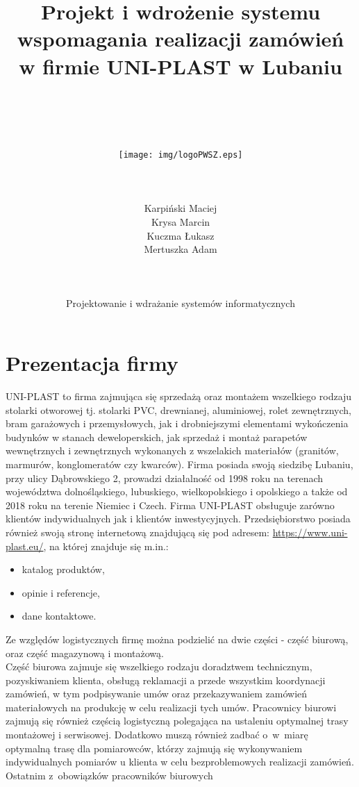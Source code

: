 \documentclass[12pt,a4paper]{article}
\author{\\\\\\\\\texttt{[image: img/logoPWSZ.eps]}\\\\\\\\
	Karpiński Maciej\\
	Krysa Marcin\\
	Kuczma Łukasz\\
	Mertuszka Adam\\\\\\\\
	Projektowanie i wdrażanie systemów informatycznych}
\title{Projekt i wdrożenie systemu wspomagania realizacji zamówień w firmie UNI-PLAST w Lubaniu}
\date{}
\begin{document}
	\maketitle
	\thispagestyle{empty}
	\clearpage

	\tableofcontents
	\newpage

	\section{Prezentacja firmy}
		\indent UNI-PLAST to firma zajmująca się sprzedażą oraz montażem wszelkiego rodzaju stolarki otworowej tj. stolarki PVC, drewnianej, aluminiowej, rolet zewnętrznych,
			bram garażowych i przemysłowych, jak i drobniejszymi elementami wykończenia budynków w stanach deweloperskich, jak sprzedaż i montaż parapetów wewnętrznych i zewnętrznych
			wykonanych z wszelakich materiałów (granitów, marmurów, konglomeratów czy kwarców). Firma posiada swoją siedzibę Lubaniu, przy ulicy Dąbrowskiego 2, prowadzi
			działalność od 1998 roku na terenach województwa dolnośląskiego, lubuskiego, wielkopolskiego i opolskiego a także od 2018 roku na terenie Niemiec i Czech.
			Firma UNI-PLAST obsługuje zarówno klientów indywidualnych jak i klientów inwestycyjnych. Przedsiębiorstwo posiada również swoją stronę internetową
			znajdującą się pod adresem: \url{https://www.uni-plast.eu/},
			na której znajduje się m.in.:
		\begin{itemize}
			\item katalog produktów,
			\item opinie i referencje,
			\item dane kontaktowe.			
		\end{itemize}
		\indent Ze względów logistycznych firmę można podzielić na dwie części - część biurową, oraz część magazynową i montażową.\\
		\indent Część biurowa zajmuje się wszelkiego rodzaju doradztwem technicznym, pozyskiwaniem klienta, obsługą reklamacji a przede wszystkim koordynacji zamówień,
			w tym podpisywanie umów oraz przekazywaniem zamówień materiałowych na produkcję w celu realizacji tych umów.
			Pracownicy biurowi zajmują się również częścią logistyczną polegająca na ustaleniu optymalnej trasy montażowej i serwisowej. Dodatkowo muszą również zadbać o~w~miarę
			optymalną trasę
			dla pomiarowców, którzy zajmują się wykonywaniem indywidualnych pomiarów u klienta w celu bezproblemowych realizacji zamówień. Ostatnim z~obowiązków pracowników biurowych
\end{document}
